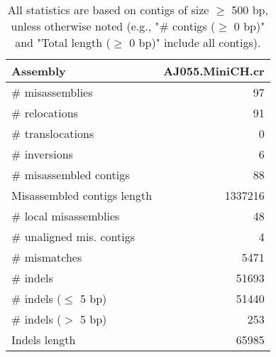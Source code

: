\documentclass[12pt,a4paper]{article}
\begin{document}
\begin{table}[ht]
\begin{center}
\caption{All statistics are based on contigs of size $\geq$ 500 bp, unless otherwise noted (e.g., "\# contigs ($\geq$ 0 bp)" and "Total length ($\geq$ 0 bp)" include all contigs).}
\begin{tabular}{|l*{1}{|r}|}
\hline
Assembly & AJ055.MiniCH.cr \\ \hline
\# misassemblies & 97 \\ \hline
\hspace{5mm}\# relocations & 91 \\ \hline
\hspace{5mm}\# translocations & 0 \\ \hline
\hspace{5mm}\# inversions & 6 \\ \hline
\# misassembled contigs & 88 \\ \hline
Misassembled contigs length & 1337216 \\ \hline
\# local misassemblies & 48 \\ \hline
\# unaligned mis. contigs & 4 \\ \hline
\# mismatches & 5471 \\ \hline
\# indels & 51693 \\ \hline
\hspace{5mm}\# indels ($\leq$ 5 bp) & 51440 \\ \hline
\hspace{5mm}\# indels ($>$ 5 bp) & 253 \\ \hline
Indels length & 65985 \\ \hline
\end{tabular}
\end{center}
\end{table}
\end{document}
